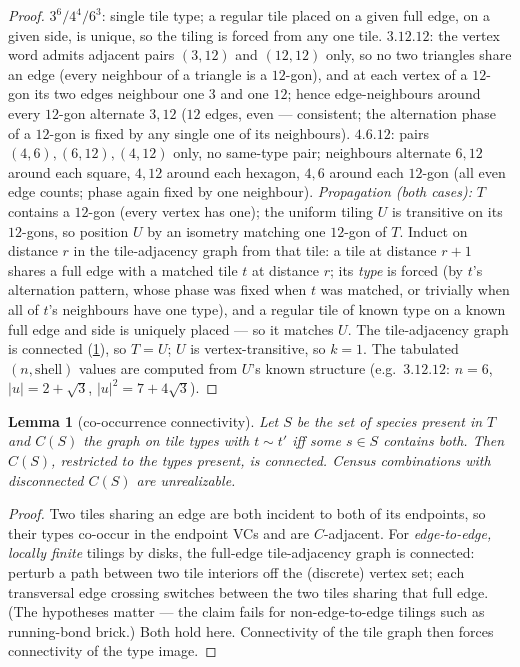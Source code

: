 \documentclass[11pt,a4paper,oneside]{article}
\theoremstyle{plain}
\newtheorem{lemma}[theorem]{Lemma}
\theoremstyle{definition}
\theoremstyle{remark}
\begin{document}
\begin{proof}
$3^6/4^4/6^3$: single tile type; a regular tile placed on a given full edge, on a given
side, is unique, so the tiling is forced from any one tile. $3.12.12$: the vertex word
admits adjacent pairs $(3,12)$ and $(12,12)$ only, so no two triangles share an edge (every
neighbour of a triangle is a $12$-gon), and at each vertex of a $12$-gon its two edges
neighbour one $3$ and one $12$; hence edge-neighbours around every $12$-gon alternate
$3,12$ ($12$ edges, even --- consistent; the alternation phase of a $12$-gon is fixed by any
single one of its neighbours). $4.6.12$: pairs $(4,6), (6,12), (4,12)$ only, no same-type
pair; neighbours alternate $6,12$ around each square, $4,12$ around each hexagon, $4,6$
around each $12$-gon (all even edge counts; phase again fixed by one neighbour).
\emph{Propagation (both cases):} $T$ contains a $12$-gon (every vertex has one); the uniform
tiling $U$ is transitive on its $12$-gons, so position $U$ by an isometry matching one
$12$-gon of $T$. Induct on distance $r$ in the tile-adjacency graph from that tile: a tile
at distance $r{+}1$ shares a full edge with a matched tile $t$ at distance $r$; its
\emph{type} is forced (by $t$'s alternation pattern, whose phase was fixed when $t$ was
matched, or trivially when all of $t$'s neighbours have one type), and a regular tile of
known type on a known full edge and side is uniquely placed --- so it matches $U$. The
tile-adjacency graph is connected (\cref{lem:cooc}), so $T = U$; $U$ is vertex-transitive,
so $k = 1$. The tabulated $(n, \text{shell})$ values are computed from $U$'s known
structure (e.g.\ $3.12.12$: $n = 6$, $|u| = 2 + \sqrt3$, $|u|^2 = 7 + 4\sqrt3$).
\end{proof}

\begin{lemma}[co-occurrence connectivity]\label{lem:cooc}
Let $S$ be the set of species present in $T$ and $C(S)$ the graph on tile types with
$t \sim t'$ iff some $s \in S$ contains both. Then $C(S)$, restricted to the types present,
is connected. Census combinations with disconnected $C(S)$ are unrealizable.
\end{lemma}

\begin{proof}
Two tiles sharing an edge are both incident to both of its endpoints, so their types
co-occur in the endpoint VCs and are $C$-adjacent. For \emph{edge-to-edge, locally finite}
tilings by disks, the full-edge tile-adjacency graph is connected: perturb a path between
two tile interiors off the (discrete) vertex set; each transversal edge crossing switches
between the two tiles sharing that full edge. (The hypotheses matter --- the claim fails
for non-edge-to-edge tilings such as running-bond brick.) Both hold here. Connectivity of
the tile graph then forces connectivity of the type image.
\end{proof}
\end{document}
